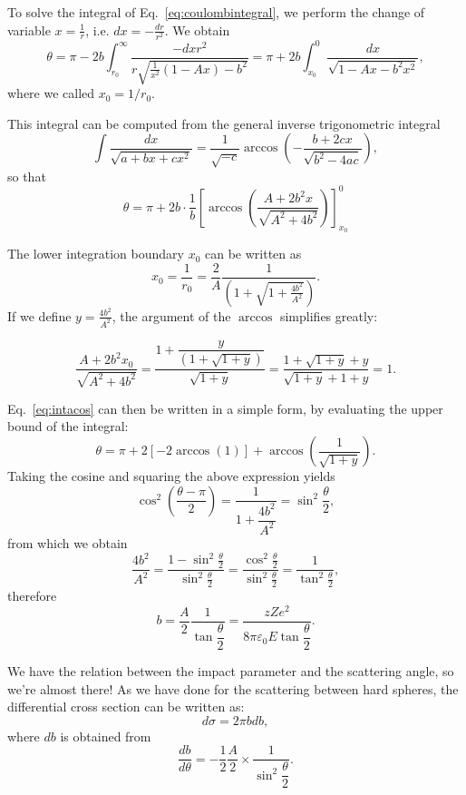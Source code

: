 To solve the integral of Eq.~\eqref{eq:coulombintegral}, we perform the change of variable $x=\frac{1}{r}$, i.e. $dx=-\frac{dr}{r^2}$. We obtain
\[ \theta = \pi - 2b \int_{r_0}^\infty \frac{-dx r^2}{r\sqrt{\frac{1}{x^2}\left(1-Ax\right)-b^2}} = \pi + 2b \int_{x_0}^{0} \frac{dx}{\sqrt{ 1 - A x - b^2 x^2}},\]
where we called $x_0=1/r_0$.

This integral can be computed from the general inverse trigonometric integral
\[ \int \frac{dx}{\sqrt{a +bx +cx^2}} = \frac{1}{\sqrt{-c}} \arccos \left ( -\frac{b+2cx}{\sqrt{b^2-4  ac}} \right ),\]
so that
\begin{equation}
    \label{eq:intacos}
     \theta = \pi + 2b \cdot \frac{1}{b} \left [ \arccos \left ( \frac{A+2b^2x}{\sqrt{A^2 + 4b^2}} \right ) \right ]_{x_0}^{0}
\end{equation}

The lower integration boundary $x_0$ can be written as
\[ x_0 =\frac{1}{r_0} = \frac{2}{A}\frac{1}{\left ( 1 + \sqrt{1 + \frac{4b^2}{A^2}} \right )}.\]
If we define $y = \frac{4b^2}{A^2}$, the argument of the $\arccos$ simplifies greatly:

$$ \frac{A+2b^2x_0}{\sqrt{A^2+4b^2}}=\frac{1+ \dfrac{y}{\left (1 + \sqrt{1+y} \right )}}{\sqrt{1+y}} = \frac{1 + \sqrt{1+y} + y}{\sqrt{1+y} + 1 + y} = 1.$$

Eq.~\eqref{eq:intacos} can then be written in a simple form, by evaluating the upper bound of the integral:
\[ \theta = \pi + 2 \left[ - 2\arccos(1)\right] + \arccos \left (\frac{1}{\sqrt{1+y}} \right ).\]
Taking the cosine and squaring the above expression yields
\[\cos ^2 \left ( \frac{\theta-\pi}{2}\right ) = \frac{1}{1+\dfrac{4b^2}{A^2}}= \sin ^2 \frac{\theta}{2},\]
from which we obtain
\[ \frac{4b^2}{A^2} = \frac{1-\sin ^2\frac{\theta}{2}}{\sin ^2 \frac{\theta}{2}} = \frac{\cos ^2\frac{\theta}{2}}{\sin ^2 \frac{\theta}{2}} = \frac{1}{\tan ^2 \frac{\theta}{2}},\]
therefore
\begin{equation}
\label{eq:ImpactParameterR}
b = \dfrac{A}{2} \dfrac{1}{\tan \dfrac{\theta}{2}} = \dfrac{zZe^2}{8 \pi \varepsilon_0 E \tan  \dfrac{\theta}{2}}.
\end{equation}

We have the relation between the impact parameter and the scattering angle, so we're almost there! As we have done for the scattering between hard spheres, the differential cross section can be written as:
\[d\sigma = 2\pi b db,\]
where $db$ is obtained from
\begin{equation}\label{eq:dbdthetainrutherford}\frac{db}{d\theta} = - \frac{1}{2} \frac{A}{2} \times  \frac{1}{\sin^2 \dfrac{\theta}{2}}.\end{equation}

